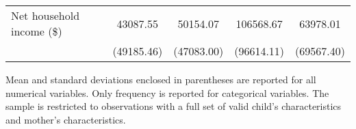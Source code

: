 \begin{table}[!t]
\begin{threeparttable}
\begin{tabular}{l*{4}{c}}
Net household income (\$)&    43087.55&    50154.07&   106568.67&    63978.01\\
                    &  (49185.46)&  (47083.00)&  (96614.11)&  (69567.40)\\
\bottomrule
\end{tabular}
	\end{threeparttable}
	\begin{tablenotes}[flushleft] \footnotesize
	\item Mean and standard deviations enclosed in parentheses are reported for all numerical variables. Only frequency is reported for categorical variables. The sample is restricted to observations with a full set of valid child's characteristics and mother's characteristics.
	\end{tablenotes}
\end{table}
